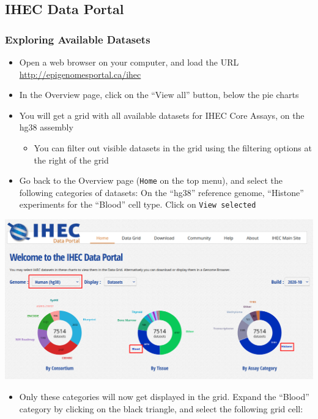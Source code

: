 \documentclass[
]{book}
\providecommand{\tightlist}{%
  \setlength{\itemsep}{0pt}\setlength{\parskip}{0pt}}
\begin{document}
\subsection{IHEC Data Portal}\label{ihec-data-portal}

\subsubsection{Exploring Available Datasets}\label{exploring-available-datasets}

\begin{itemize}
\tightlist
\item
  Open a web browser on your computer, and load the URL \url{http://epigenomesportal.ca/ihec}
\item
  In the Overview page, click on the ``View all'' button, below the pie charts
\item
  You will get a grid with all available datasets for IHEC Core Assays, on the hg38 assembly

  \begin{itemize}
  \tightlist
  \item
    You can filter out visible datasets in the grid using the filtering options at the right of the grid
  \end{itemize}
\item
  Go back to the Overview page (\texttt{Home} on the top menu), and select the following categories of datasets: On the ``hg38'' reference genome, ``Histone'' experiments for the ``Blood'' cell type. Click on \texttt{View\ selected}
\end{itemize}

\includegraphics{./img/portal_select_from_overview.png}

\begin{itemize}
\tightlist
\item
  Only these categories will now get displayed in the grid. Expand the ``Blood'' category by clicking on the black triangle, and select the following grid cell:
\end{itemize}
\end{document}

